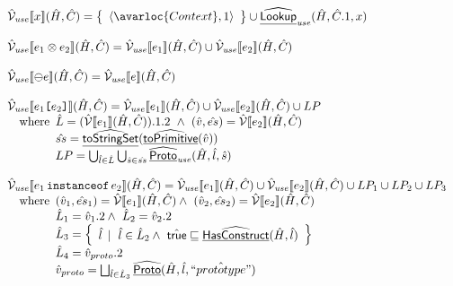\[\begin{array}{l}
  \aV_{\it use}\lbr x\rbr(\hat{H},\hat{C})
  = \set{\langle\avarloc{Context},1\rangle} \cup \ahf{Lookup}_{\it use}(\hat{H},\hat{C}.1,x)
  \\\\
  \aV_{\it use}\lbr e_1 \inop e_2\rbr(\hat{H},\hat{C})
  = \aV_{\it use}\lbr e_1\rbr(\hat{H},\hat{C}) \cup \aV_{\it use}\lbr e_2\rbr(\hat{H},\hat{C})
  \\\\
  \aV_{\it use}\lbr \preop e\rbr(\hat{H},\hat{C})
  = \aV_{\it use}\lbr e\rbr(\hat{H},\hat{C})
  \\\\
  \aV_{\it use}\lbr e_1\TT{[}e_2\TT{]}\rbr(\hat{H},\hat{C})
  = \aV_{\it use}\lbr e_1\rbr(\hat{H},\hat{C}) \cup \aV_{\it use}\lbr e_2\rbr(\hat{H},\hat{C}) \cup LP\\
  \quad\wherec{
     \hat{L} = (\aV\lbr e_1\rbr(\hat{H},\hat{C})).1.2\ 
     \land\ (\hat{v}, \hat{es}) = \aV\lbr e_2\rbr(\hat{H},\hat{C}) \\
     \hat{ss} = \ahf{toStringSet}(\ahf{toPrimitive}(\hat{v})) \\
     LP = \bigcup_{\hat{l}\in\hat{L}} \bigcup_{\hat{s}\in\hat{ss}} \ahf{Proto}_{\it use}(\hat{H},\hat{l},\hat{s})
  }
  \\\\
  \aV_{\it use}\lbr e_1\,\TT{instanceof}\,e_2\rbr (\hat{H},\hat{C})
  = \aV_{\it use}\lbr e_1\rbr(\hat{H},\hat{C}) \cup \aV_{\it use}\lbr e_2\rbr(\hat{H},\hat{C}) \cup LP_1\cup LP_2\cup LP_3\\
  \quad\wherec{
    (\hat{v}_1,\hat{es}_1) = \aV\lbr e_1\rbr(\hat{H},\hat{C})
    \land\ (\hat{v}_2,\hat{es}_2) = \aV\lbr e_2\rbr(\hat{H},\hat{C})\\
    \hat{L}_1 = \hat{v}_1.2 \land\ \hat{L}_2 = \hat{v}_2.2\\
    \hat{L}_3 = \set{ \hat{l} \,\mid\ \hat{l}\in\hat{L}_2\land\ \atrue\sqsubseteq\ahf{HasConstruct}(\hat{H},\hat{l}) } \\
    \hat{L}_4 = \hat{v}_{proto}.2 \\
    \hat{v}_{proto} = \bigsqcup_{\hat{l}\in\hat{L}_3} \ahf{Proto}(\hat{H},\hat{l},\hat{``prototype"}) \\
   
}
\end{array}\]
